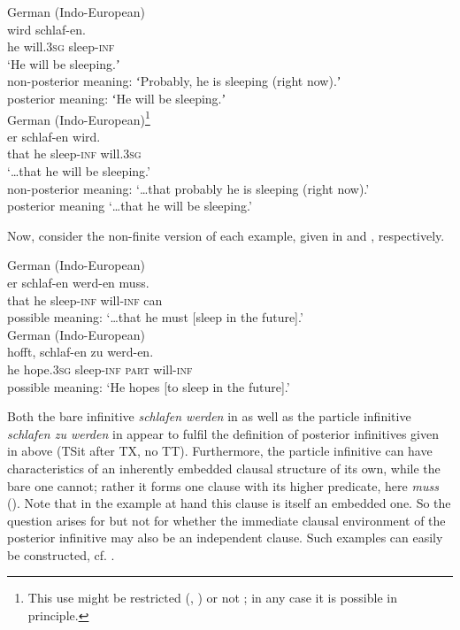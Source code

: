 \documentclass[output=paper,hidelinks]{langscibook}
\begin{document}
\ea\label{ex:reiner:13} German (Indo-European) \\
	{wird}		{schlaf-en.}\\
he	will.\textsc{3sg}	sleep-\textsc{inf}\\
\glt ‘He will be sleeping.ʼ\\
non-posterior meaning: ʻProbably, he is sleeping (right now).ʼ \\
posterior meaning: ʻHe will be sleeping.ʼ\\
\ex\label{ex:reiner:14} German (Indo-European)\footnote{This use might be restricted (\citealt[195–196]{Wilmanns1906}, \citealt[230]{Gelhaus1975}) or not \citep[27]{Hilpert2008}; in any case it is possible in principle.}\\
	{er}	{schlaf-en}	{wird.}\\
that	he	sleep-\textsc{inf}	will.\textsc{3sg}\\
\glt  ‘\dots that he will be sleeping.’ \\
non-posterior meaning: ‘\dots that probably he is sleeping (right now).’ \\
posterior meaning ‘\dots that he will be sleeping.’\\
\z

Now, consider the non-finite version of each example, given in  and , respectively.


\ea\label{ex:reiner:15} German (Indo-European) \\
	{er}	{schlaf-en}	{werd-en}	{muss.}\\
        that	he	sleep-\textsc{inf}	will-\textsc{inf}	can \\
\glt    possible meaning: ‘\dots that he must [sleep in the future].’ \\
\ex\label{ex:reiner:16} German (Indo-European) \\
	{hofft,}		{schlaf-en}	{zu}	{werd-en.}\\
        he	hope.\textsc{3sg}	sleep-\textsc{inf} \textsc{part}	will-\textsc{inf}\\
\glt possible meaning: ‘He hopes [to sleep in the future].’\\
\z

Both the bare infinitive \emph{schlafen werden}  in  as well as the particle infinitive \emph{schlafen zu werden} in  appear to fulfil the definition of posterior infinitives given in  above (TSit after TX, no TT). Furthermore, the particle infinitive can have characteristics of an inherently embedded clausal structure of its own, while the bare one cannot; rather it forms one clause with its higher predicate, here \emph{muss} (\citealt{RappWöllstein2013}). Note that in the example at hand this clause is itself an embedded one. So the question arises for  but not for  whether the immediate clausal environment of the posterior infinitive may also be an independent clause. Such examples can easily be constructed, cf. .
\end{document}
